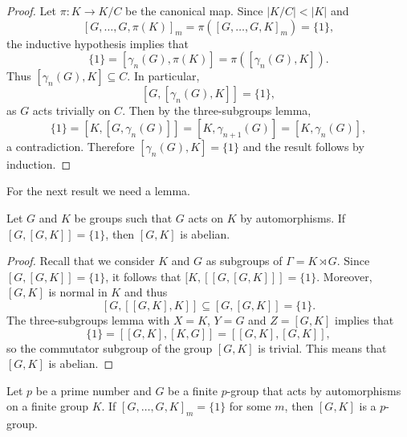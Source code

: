 \begin{proof}
	Let $\pi\colon K\to K/C$ be the canonical map. 
	Since $|K/C|<|K|$ and
	\[
	[G,\dots,G,\pi(K)]_m=\pi([G,\dots,G,K]_m)=\{1\},
	\]
	the inductive hypothesis implies that 
	\[
	\{1\}=[\gamma_n(G),\pi(K)]=\pi([\gamma_n(G),K]).
	\]
	Thus $[\gamma_n(G),K]\subseteq C$. In particular, 
	\[
	[G,[\gamma_n(G),K]]=\{1\},
	\]
	as $G$ acts trivially on $C$. Then by the three-subgroups lemma,
	\[ \{1\}=[K,[G,\gamma_n(G)]]=[K,\gamma_{n+1}(G)]=[K,\gamma_n(G)],\]
	a contradiction. Therefore $[\gamma_n(G),K]=\{ 1\}$ and the result follows by induction.
\end{proof}

For the next result we need a lemma.

\begin{lemma}
\label{lem:[G,K]abelian}
Let $G$ and $K$ be groups such that $G$ acts on $K$ by automorphisms. If $[G,[G,K]]=\{1\}$, then $[G,K]$ is abelian.	
\end{lemma}

\begin{proof} Recall that we consider $K$ and $G$ as subgroups of $\Gamma=K\rtimes G$.
	Since $[G,[G,K]]=\{1\}$, it follows that $[K,[[G,[G,K]]]=\{1\}$. Moreover, $[G,K]$ is normal in $K$ and thus 
	\[
	[G,[[G,K],K]]\subseteq [G,[G,K]]=\{1\}. 
	\]
	The three-subgroups lemma with $X=K$, $Y=G$ and $Z=[G,K]$ implies that
	\[
	\{1\}=[[G,K],[K,G]]=[[G,K],[G,K]],
	\]
	so the commutator subgroup of the group 
	$[G,K]$ is trivial. This means that $[G,K]$ is abelian. 
\end{proof}


\begin{theorem}
\label{thm:[G,K]_pgroup}
	Let $p$ be a prime number 
	and $G$ be a finite $p$-group that acts by automorphisms on a finite group $K$. If $[G,\dots,G,K]_m=\{1\}$ for some 
	$m$, then $[G,K]$ is a $p$-group. 
\end{theorem}

